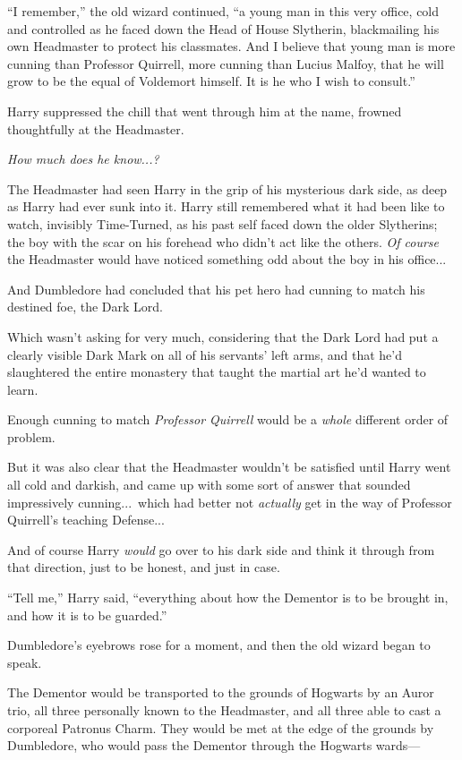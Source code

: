 “I remember,” the old wizard continued, “a young man in this very office, cold and controlled as he faced down the Head of House Slytherin, blackmailing his own Headmaster to protect his classmates. And I believe that young man is more cunning than Professor Quirrell, more cunning than Lucius Malfoy, that he will grow to be the equal of Voldemort himself. It is he who I wish to consult.”

Harry suppressed the chill that went through him at the name, frowned thoughtfully at the Headmaster.

\emph{How much does he know...?}

The Headmaster had seen Harry in the grip of his mysterious dark side, as deep as Harry had ever sunk into it. Harry still remembered what it had been like to watch, invisibly Time-Turned, as his past self faced down the older Slytherins; the boy with the scar on his forehead who didn’t act like the others. \emph{Of course} the Headmaster would have noticed something odd about the boy in his office...

And Dumbledore had concluded that his pet hero had cunning to match his destined foe, the Dark Lord.

Which wasn’t asking for very much, considering that the Dark Lord had put a clearly visible Dark Mark on all of his servants’ left arms, and that he’d slaughtered the entire monastery that taught the martial art he’d wanted to learn.

Enough cunning to match \emph{Professor Quirrell} would be a \emph{whole} different order of problem.

But it was also clear that the Headmaster wouldn’t be satisfied until Harry went all cold and darkish, and came up with some sort of answer that sounded impressively cunning...\ which had better not \emph{actually} get in the way of Professor Quirrell’s teaching Defense...

And of course Harry \emph{would} go over to his dark side and think it through from that direction, just to be honest, and just in case.

“Tell me,” Harry said, “everything about how the Dementor is to be brought in, and how it is to be guarded.”

Dumbledore’s eyebrows rose for a moment, and then the old wizard began to speak.

The Dementor would be transported to the grounds of Hogwarts by an Auror trio, all three personally known to the Headmaster, and all three able to cast a corporeal Patronus Charm. They would be met at the edge of the grounds by Dumbledore, who would pass the Dementor through the Hogwarts wards—

